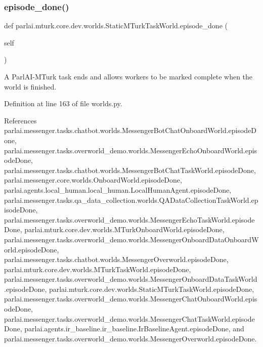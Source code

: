 \subsubsection{\texorpdfstring{episode\+\_\+done()}{episode\_done()}}
{\footnotesize\ttfamily def parlai.\+mturk.\+core.\+dev.\+worlds.\+Static\+M\+Turk\+Task\+World.\+episode\+\_\+done (\begin{DoxyParamCaption}\item[{}]{self }\end{DoxyParamCaption})}

\begin{DoxyVerb}A ParlAI-MTurk task ends and allows workers to be marked complete
when the world is finished.
\end{DoxyVerb}
 

Definition at line 163 of file worlds.\+py.



References parlai.\+messenger.\+tasks.\+chatbot.\+worlds.\+Messenger\+Bot\+Chat\+Onboard\+World.\+episode\+Done, parlai.\+messenger.\+tasks.\+overworld\+\_\+demo.\+worlds.\+Messenger\+Echo\+Onboard\+World.\+episode\+Done, parlai.\+messenger.\+tasks.\+chatbot.\+worlds.\+Messenger\+Bot\+Chat\+Task\+World.\+episode\+Done, parlai.\+messenger.\+core.\+worlds.\+Onboard\+World.\+episode\+Done, parlai.\+agents.\+local\+\_\+human.\+local\+\_\+human.\+Local\+Human\+Agent.\+episode\+Done, parlai.\+messenger.\+tasks.\+qa\+\_\+data\+\_\+collection.\+worlds.\+Q\+A\+Data\+Collection\+Task\+World.\+episode\+Done, parlai.\+messenger.\+tasks.\+overworld\+\_\+demo.\+worlds.\+Messenger\+Echo\+Task\+World.\+episode\+Done, parlai.\+mturk.\+core.\+dev.\+worlds.\+M\+Turk\+Onboard\+World.\+episode\+Done, parlai.\+messenger.\+tasks.\+overworld\+\_\+demo.\+worlds.\+Messenger\+Onboard\+Data\+Onboard\+World.\+episode\+Done, parlai.\+messenger.\+tasks.\+chatbot.\+worlds.\+Messenger\+Overworld.\+episode\+Done, parlai.\+mturk.\+core.\+dev.\+worlds.\+M\+Turk\+Task\+World.\+episode\+Done, parlai.\+messenger.\+tasks.\+overworld\+\_\+demo.\+worlds.\+Messenger\+Onboard\+Data\+Task\+World.\+episode\+Done, parlai.\+mturk.\+core.\+dev.\+worlds.\+Static\+M\+Turk\+Task\+World.\+episode\+Done, parlai.\+messenger.\+tasks.\+overworld\+\_\+demo.\+worlds.\+Messenger\+Chat\+Onboard\+World.\+episode\+Done, parlai.\+messenger.\+tasks.\+overworld\+\_\+demo.\+worlds.\+Messenger\+Chat\+Task\+World.\+episode\+Done, parlai.\+agents.\+ir\+\_\+baseline.\+ir\+\_\+baseline.\+Ir\+Baseline\+Agent.\+episode\+Done, and parlai.\+messenger.\+tasks.\+overworld\+\_\+demo.\+worlds.\+Messenger\+Overworld.\+episode\+Done.

